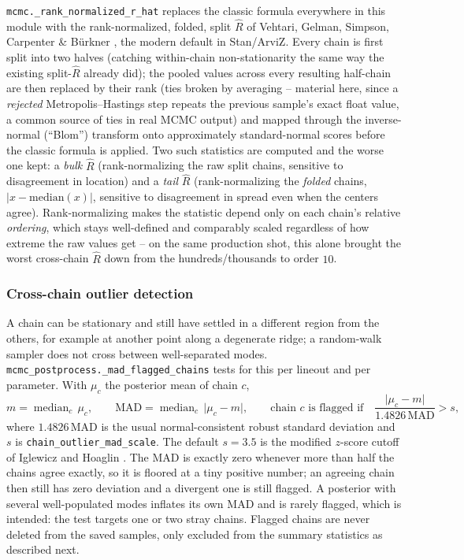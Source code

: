 \documentclass[11pt]{article}
\newcommand{\code}[1]{\texttt{#1}}
\begin{document}
\code{mcmc.\_rank\_normalized\_r\_hat} replaces the classic formula everywhere in this
module with the rank-normalized, folded, split $\hat R$ of Vehtari, Gelman, Simpson,
Carpenter \& B\"urkner \cite{vehtari2021}, the modern default in Stan/ArviZ. Every chain
is first split into two halves (catching within-chain non-stationarity the same way the
existing split-$\hat R$ already did); the pooled values across every resulting half-chain
are then replaced by their rank (ties broken by averaging -- material here, since a
\emph{rejected} Metropolis--Hastings step repeats the previous sample's exact float value,
a common source of ties in real MCMC output) and mapped through the inverse-normal
(``Blom'') transform onto approximately standard-normal scores before the classic formula
is applied. Two such statistics are computed and the worse one kept: a \emph{bulk}
$\hat R$ (rank-normalizing the raw split chains, sensitive to disagreement in location)
and a \emph{tail} $\hat R$ (rank-normalizing the \emph{folded} chains,
$\vert x-\mathrm{median}(x)\vert$, sensitive to disagreement in spread even when the
centers agree). Rank-normalizing makes the statistic depend only on each chain's relative
\emph{ordering}, which stays well-defined and comparably scaled regardless of how extreme
the raw values get -- on the same production shot, this alone brought the worst
cross-chain $\hat R$ down from the hundreds/thousands to order $10$.

\subsubsection{Cross-chain outlier detection}\label{sec:uq-mcmc-mad}

A chain can be stationary and still have settled in a different region from the others,
for example at another point along a degenerate ridge; a random-walk sampler does not
cross between well-separated modes. \code{mcmc\_postprocess.\_mad\_flagged\_chains}
tests for this per lineout and per parameter. With $\mu_c$ the posterior mean of chain
$c$,
\begin{equation}
  m=\operatorname{median}_c\,\mu_c,\qquad
  \mathrm{MAD}=\operatorname{median}_c\,\vert\mu_c-m\vert,\qquad
  \text{chain $c$ is flagged if}\quad \frac{\vert\mu_c-m\vert}{1.4826\,\mathrm{MAD}}>s ,
\end{equation}
where $1.4826\,\mathrm{MAD}$ is the usual normal-consistent robust standard deviation and
$s$ is \code{chain\_outlier\_mad\_scale}. The default $s=3.5$ is the modified $z$-score
cutoff of Iglewicz and Hoaglin \cite{iglewicz1993}. The MAD is exactly zero whenever more
than half the chains agree exactly, so it is floored at a tiny positive number; an
agreeing chain then still has zero deviation and a divergent one is still flagged. A
posterior with several well-populated modes inflates its own MAD and is rarely flagged,
which is intended: the test targets one or two stray chains. Flagged chains are never
deleted from the saved samples, only excluded from the summary statistics as described
next.
\end{document}
